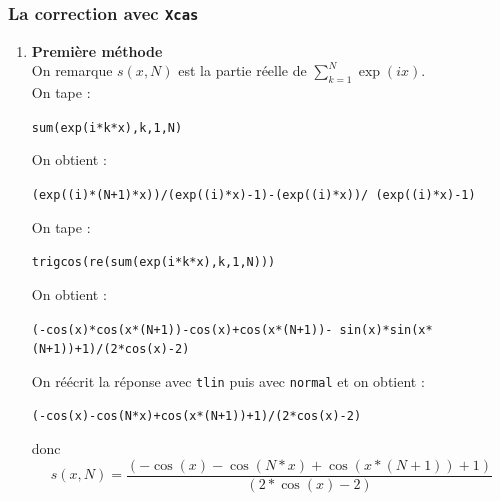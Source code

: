 \documentclass[a4paper,11pt]{book}
\begin{document}
\subsubsection{La correction avec {\tt Xcas}}
\begin{enumerate}
\item {\bf Premi\`ere m\'ethode}\\
On remarque $s(x,N)$ est la partie r\'eelle de  $\sum_{k=1}^N\exp(ix)$.\\
On tape :
\begin{center}{\tt sum(exp(i*k*x),k,1,N)}\end{center}
On obtient :
\begin{center}{\tt (exp((i)*(N+1)*x))/(exp((i)*x)-1)-(exp((i)*x))/ (exp((i)*x)-1)}\end{center}
On tape :
\begin{center}{\tt trigcos(re(sum(exp(i*k*x),k,1,N)))}\end{center}
On obtient :
\begin{center}{\tt (-cos(x)*cos(x*(N+1))-cos(x)+cos(x*(N+1))- sin(x)*sin(x*(N+1))+1)/(2*cos(x)-2)}\end{center}
On r\'e\'ecrit la r\'eponse avec {\tt tlin} puis avec {\tt normal} et on 
obtient :
\begin{center}{\tt (-cos(x)-cos(N*x)+cos(x*(N+1))+1)/(2*cos(x)-2)}\end{center}
donc
$$s(x,N)=\frac{(-\cos(x)-\cos(N*x)+\cos(x*(N+1))+1)}{(2*\cos(x)-2)}$$


\end{enumerate}
\end{document}
